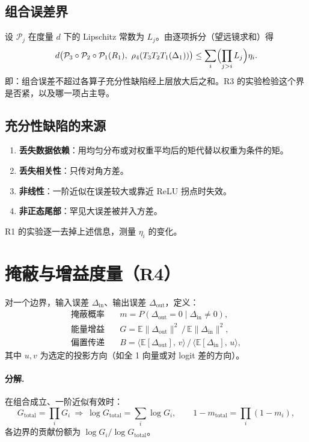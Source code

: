 \documentclass[11pt,a4paper]{ctexart}
\newcommand{\E}{\mathbb{E}}
\begin{document}
\subsection{组合误差界}
设 $\mathcal P_j$ 在度量 $d$ 下的 Lipschitz 常数为 $L_j$。由逐项拆分（望远镜求和）得
\begin{equation}
d\bigl(\mathcal P_{3}\circ\mathcal P_{2}\circ\mathcal P_{1}(R_1),\ \rho_4(T_3 T_2 T_1(\Delta_1))\bigr) \le \sum_{i}\Bigl(\prod_{j>i}L_j\Bigr)\eta_i .
\end{equation}
即：组合误差不超过各算子充分性缺陷经上层放大后之和。R3 的实验检验这个界是否紧，以及哪一项占主导。

\subsection{充分性缺陷的来源}
\begin{enumerate}[leftmargin=*]
  \item \textbf{丢失数据依赖}：用均匀分布或对权重平均后的矩代替以权重为条件的矩。
  \item \textbf{丢失相关性}：只传对角方差。
  \item \textbf{非线性}：一阶近似在误差较大或靠近 ReLU 拐点时失效。
  \item \textbf{非正态尾部}：罕见大误差被并入方差。
\end{enumerate}
R1 的实验逐一去掉上述信息，测量 $\eta_i$ 的变化。

\section{掩蔽与增益度量（R4）}
对一个边界，输入误差 $\Delta_{\text{in}}$、输出误差 $\Delta_{\text{out}}$，定义：
\begin{align}
\text{掩蔽概率}\quad & m = P(\Delta_{\text{out}} = 0 \mid \Delta_{\text{in}} \ne 0),\\
\text{能量增益}\quad & G = \E\|\Delta_{\text{out}}\|^2 \,/\, \E\|\Delta_{\text{in}}\|^2,\\
\text{偏置传递}\quad & B = \langle\E[\Delta_{\text{out}}],\,v\rangle \,/\, \langle\E[\Delta_{\text{in}}],\,u\rangle,
\end{align}
其中 $u, v$ 为选定的投影方向（如全 1 向量或对 logit 差的方向）。

\paragraph{分解.} 在组合成立、一阶近似有效时：
\begin{equation}
G_{\text{total}} = \prod_i G_i \ \Rightarrow\ \log G_{\text{total}} = \sum_i \log G_i,\qquad
1 - m_{\text{total}} = \prod_i (1 - m_i),
\end{equation}
各边界的贡献份额为 $\log G_i/\log G_{\text{total}}$。
\end{document}
